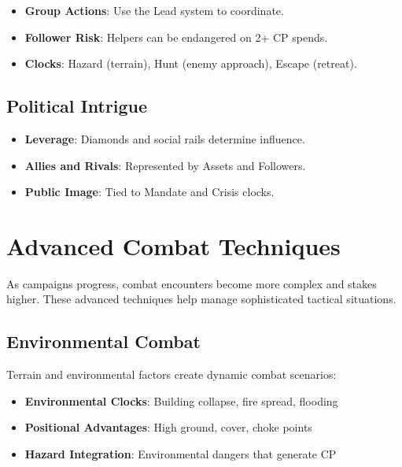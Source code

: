 \begin{itemize}
    \item \textbf{Group Actions}: Use the Lead system to coordinate.
    \item \textbf{Follower Risk}: Helpers can be endangered on 2+ CP spends.
    \item \textbf{Clocks}: Hazard (terrain), Hunt (enemy approach), Escape (retreat).
\end{itemize}

\subsection*{Political Intrigue}

\begin{itemize}
    \item \textbf{Leverage}: Diamonds and social rails determine influence.
    \item \textbf{Allies and Rivals}: Represented by Assets and Followers.
    \item \textbf{Public Image}: Tied to Mandate and Crisis clocks.
\end{itemize}

\section*{Advanced Combat Techniques}

As campaigns progress, combat encounters become more complex and stakes higher. These advanced techniques help manage sophisticated tactical situations.

\subsection*{Environmental Combat}

Terrain and environmental factors create dynamic combat scenarios:

\begin{itemize}
    \item \textbf{Environmental Clocks}: Building collapse, fire spread, flooding
    \item \textbf{Positional Advantages}: High ground, cover, choke points
    \item \textbf{Hazard Integration}: Environmental dangers that generate CP
\end{itemize}


